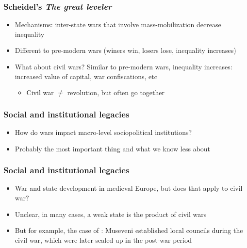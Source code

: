 \documentclass[aspectratio=43]{beamer}
\begin{document}
\begin{frame}
\frametitle{Scheidel's \textit{The great leveler}}
\centering

\begin{itemize}
  \item Mechanisms: inter-state wars that involve mass-mobilization decrease inequality
  \item Different to pre-modern wars (winers win, losers lose, inequality increases)
  \item What about civil wars? Similar to pre-modern wars, inequality increases: increased value of capital, war confiscations, etc
  \begin{itemize}
    \item Civil war $\neq$ revolution, but often go together
  \end{itemize}
\end{itemize}


\end{frame}



\begin{frame}
\frametitle{Social and institutional legacies}
\centering

\begin{itemize}
  \item How do wars impact macro-level sociopolitical institutions?
  \item Probably the most important thing and what we know less about
\end{itemize}

\end{frame}

\begin{frame}
\frametitle{Social and institutional legacies}
\centering

\begin{itemize}[<+->]
  \item War and state development in medieval Europe, but does that apply to civil war?
  \item Unclear, in many cases, a weak state is the product of civil wars
  \item But for example, the case of {\color{red}{Uganda}}: Museveni established local councils during the civil war, which were later scaled up in the post-war period
\end{itemize}

\end{frame}
\end{document}
